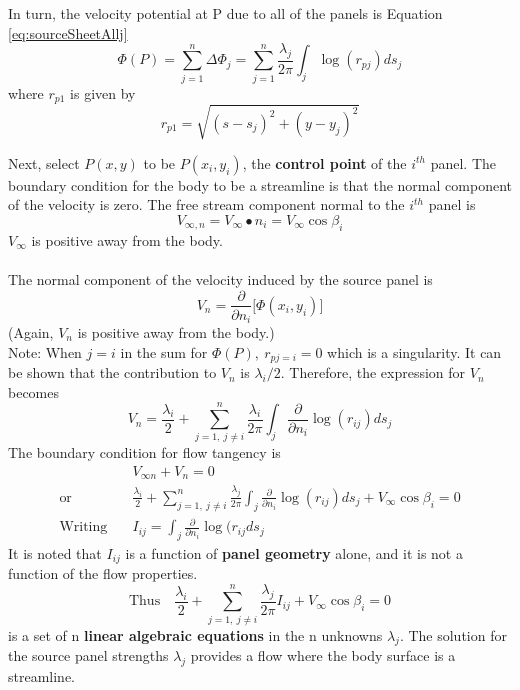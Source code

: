 \documentclass[draft=false, titlepage]{article}
\newcommand{\partialfrac}[2]{\frac{\partial #1}{\partial #2}}
\begin{document}
In turn, the velocity potential at P due to all of the panels is Equation \ref{eq:sourceSheetAllj}
\begin{equation}
    \Phi(P) =\sum_{j=1}^n \Delta \Phi_j = \sum_{j=1}^n \frac{\lambda_j}{2\pi} \int_j \log(r_{pj})ds_j
    \label{eq:sourceSheetAllj}
\end{equation}
where $r_{p1}$ is given by
\begin{equation*}
    r_{p1} = \sqrt{ (s-s_j)^2 + (y-y_j)^2 }
\end{equation*}

Next, select $P(x,y)$ to be $P(x_i, y_i)$, the \textbf{control point} of the $i^{th}$ panel. The boundary condition for the body to be a streamline is that the normal component of the velocity is zero. The free stream component normal to the $i^{th}$ panel is
\begin{equation*}
    V_{\infty, n} = V_\infty \bullet n_i = V_\infty \cos\beta_i
\end{equation*}
$V_\infty$ is positive away from the body.
\paragraph*{} The normal component of the velocity induced by the source panel is
\begin{equation*}
V_n= \partialfrac{}{n_i} \big[ \Phi(x_i, y_i) \big]
\end{equation*}
(Again, $V_n$ is positive away from the body.)\\


Note: When $j=i$ in the sum for $\Phi(P),\ r_{pj=i}=0$ which is a singularity. It can be shown that the contribution to $V_n$ is $\lambda_i/2$. Therefore, the expression for $V_n$ becomes
\begin{equation*}
    V_n = \frac{\lambda_i}{2} + \sum_{j=1,\ j\neq i}^n \frac{\lambda_i}{2\pi} \int_j \partialfrac{}{n_i} \log(r_{ij})ds_j
\end{equation*}
The boundary condition for flow tangency is
\begin{align*}
   &  V_{\infty n} + V_n = 0\\
    \text{or} \quad& \frac{\lambda_i}{2} + \sum_{j=1,\ j\neq i}^n \frac{\lambda_j}{2\pi} \int_j \partialfrac{}{n_i} \log(r_{ij}) ds_j + V_\infty \cos\beta_i = 0\\
    \text{Writing} \quad& I_{ij} = \int_j \partialfrac{}{n_i} \log(r_{ij} ds_j
\end{align*}
It is noted that $I_{ij}$ is a function of \textbf{panel geometry} alone, and it is not a function of the flow properties.
\begin{equation*}
    \text{Thus} \quad
    \frac{\lambda_i}{2} + \sum_{j=1,\ j\neq i}^n \frac{\lambda_j}{2\pi} I_{ij} + V_\infty \cos\beta_i = 0
\end{equation*}
is a set of n \textbf{linear algebraic equations} in the n unknowns $\lambda_j$. The solution for the source panel strengths $\lambda_j$ provides a flow where the body surface is a streamline.
\end{document}
